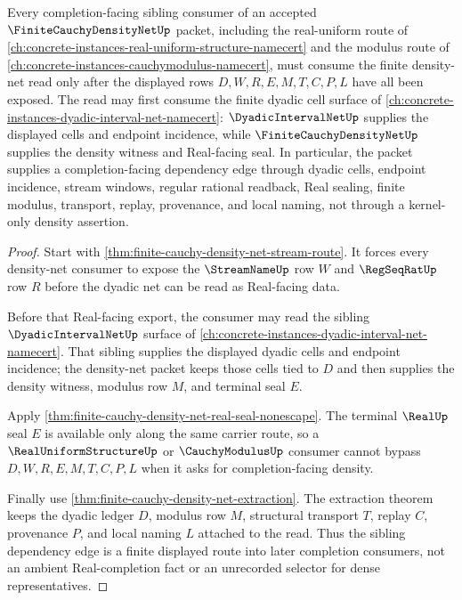 \begin{theorem}
\label{thm:finite-cauchy-density-net-sibling-route}
Every completion-facing sibling consumer of an accepted $\FiniteCauchyDensityNetUp$ packet, including the real-uniform route of \autoref{ch:concrete-instances-real-uniform-structure-namecert} and the modulus route of \autoref{ch:concrete-instances-cauchymodulus-namecert}, must consume the finite density-net read only after the displayed rows $D,W,R,E,M,T,C,P,L$ have all been exposed. The read may first consume the finite dyadic cell surface of \autoref{ch:concrete-instances-dyadic-interval-net-namecert}: $\DyadicIntervalNetUp$ supplies the displayed cells and endpoint incidence, while $\FiniteCauchyDensityNetUp$ supplies the density witness and Real-facing seal. In particular, the packet supplies a completion-facing dependency edge through dyadic cells, endpoint incidence, stream windows, regular rational readback, Real sealing, finite modulus, transport, replay, provenance, and local naming, not through a kernel-only density assertion.
\end{theorem}
\begin{proof}
Start with \autoref{thm:finite-cauchy-density-net-stream-route}. It forces every density-net consumer to expose the $\StreamNameUp$ row $W$ and $\RegSeqRatUp$ row $R$ before the dyadic net can be read as Real-facing data.

Before that Real-facing export, the consumer may read the sibling $\DyadicIntervalNetUp$ surface of \autoref{ch:concrete-instances-dyadic-interval-net-namecert}. That sibling supplies the displayed dyadic cells and endpoint incidence; the density-net packet keeps those cells tied to $D$ and then supplies the density witness, modulus row $M$, and terminal seal $E$.

Apply \autoref{thm:finite-cauchy-density-net-real-seal-nonescape}. The terminal $\RealUp$ seal $E$ is available only along the same carrier route, so a $\RealUniformStructureUp$ or $\CauchyModulusUp$ consumer cannot bypass $D,W,R,E,M,T,C,P,L$ when it asks for completion-facing density.

Finally use \autoref{thm:finite-cauchy-density-net-extraction}. The extraction theorem keeps the dyadic ledger $D$, modulus row $M$, structural transport $T$, replay $C$, provenance $P$, and local naming $L$ attached to the read. Thus the sibling dependency edge is a finite displayed route into later completion consumers, not an ambient Real-completion fact or an unrecorded selector for dense representatives.
\end{proof}


